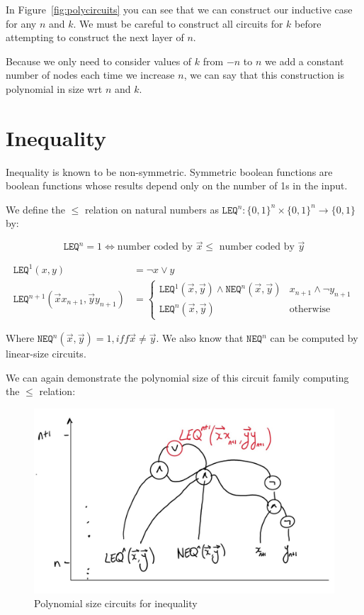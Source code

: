\documentclass{article}
\begin{document}
    In Figure~\ref{fig:polycircuits} you can see that we can construct our inductive case for any $n$ and $k$. We must be careful to construct all circuits for $k$ before attempting to construct the next layer of $n$.

    Because we only need to consider values of $k$ from $-n$ to $n$ we add a constant number of nodes each time we increase $n$, we can say that this construction is polynomial in size wrt $n$ and $k$.

    \section{Inequality}

    Inequality is known to be non-symmetric. Symmetric boolean functions are boolean functions whose results depend only on the number of 1s in the input.

    We define the $\leq$ relation on natural numbers as $\texttt{LEQ}^{n}: \{ 0,1 \} ^{n} \times \{ 0,1 \} ^{n} \rightarrow \{ 0,1 \} $ by:

    \[
      \texttt{LEQ}^{n} = 1 \Longleftrightarrow \text{number coded by } \vec{x} \leq \text{ number coded by } \vec{y}
    \]


    \begin{align*}
      \texttt{LEQ}^{1}(x,y) &= \neg x \vee y   \\
      \texttt{LEQ}^{n+1}(\vec{x}x_{n+1},\vec{y}y_{n+1}) &= \begin{cases}
        \texttt{LEQ}^{1}(\vec{x},\vec{y}) \wedge \texttt{NEQ}^{n}(\vec{x},\vec{y}) & x_{n+1} \wedge \neg y_{n+1} \\
        \texttt{LEQ}^{n}(\vec{x},\vec{y}) & \text{otherwise}
      \end{cases}
    \end{align*}

    Where $\texttt{NEQ}^{n}(\vec{x},\vec{y}) = 1, iff \vec{x} \neq \vec{y}$. We also know that $\texttt{NEQ}^{n}$ can be computed by linear-size circuits.

    We can again demonstrate the polynomial size of this circuit family computing the $\leq$ relation:

    \begin{figure}[ht]
      \centering
      \includegraphics[scale=0.4]{figures/ineqcircuits}
      \caption{\label{fig:ineqcircuits} Polynomial size circuits for inequality}
    \end{figure}
\end{document}
